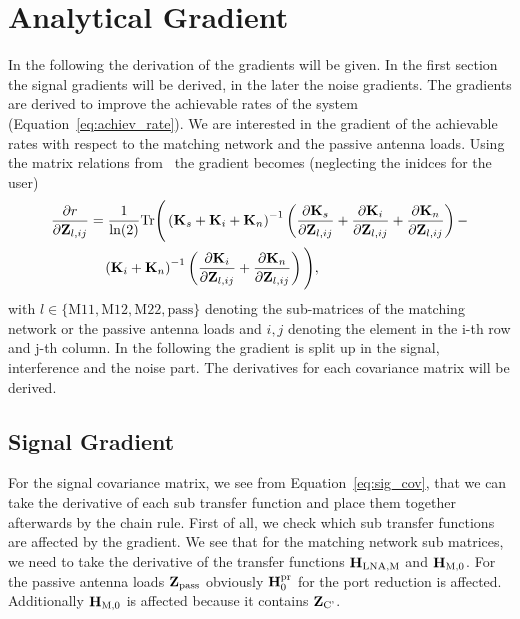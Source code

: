\chapter{Analytical Gradient}
\label{sec:ana_grad}
In the following the derivation of the gradients will be given.
In the first section the signal gradients will be derived, in the later the noise gradients.
The gradients are derived to improve the achievable rates of the system (Equation~\eqref{eq:achiev_rate}).
We are interested in the gradient of the achievable rates with respect to the matching network and the passive antenna loads.
Using the matrix relations from~\cite{Codebook12} the gradient becomes (neglecting the inidces for the user)
\begin{align}
\label{eq:gradient}\nonumber
\frac{\partial r}{\partial\mathbf{Z}_{l,ij}} &= \frac{1}{\text{ln}(2)} 
\text{Tr}\Bigg(\left(\mathbf{K}_s + \mathbf{K}_i + \mathbf{K}_n\right)^{-1}
\left(\frac{\partial\mathbf{K}_s}{\partial\mathbf{Z}_{l,ij}}+
 \frac{\partial\mathbf{K}_i}{\partial\mathbf{Z}_{l,ij}}+
 \frac{\partial\mathbf{K}_n}{\partial\mathbf{Z}_{l,ij}}\right)-\\
 &\quad\left(\mathbf{K}_i+\mathbf{K}_n\right)^{-1}
 \left(\frac{\partial\mathbf{K}_i}{\partial\mathbf{Z}_{l,ij}}+
 	\frac{\partial\mathbf{K}_n}{\partial\mathbf{Z}_{l,ij}}\right)\Bigg),
\end{align}
with $l\in\{\text{M}11,\text{M}12,\text{M}22,\text{pass}\}$ denoting the sub-matrices of the matching network or the passive antenna loads and $i,j$ denoting the element in the i-th row and j-th column.
In the following the gradient is split up in the signal, interference and the noise part.
The derivatives for each covariance matrix will be derived.

\section{Signal Gradient}
\label{sec:signal_gradient}
 For the signal covariance matrix, we see from Equation~\eqref{eq:sig_cov}, that we can take the derivative of each sub transfer function and place them together afterwards by the chain rule.
First of all, we check which sub transfer functions are affected by the gradient.
We see that for the matching network sub matrices, we need to take the derivative of the transfer functions $\mathbf{H}_\text{LNA,M}$ and $\mathbf{H}_\text{M,0}$.
For the passive antenna loads $\mathbf{Z}_\text{pass}$ obviously $\mathbf{H}_0^{\text{pr}}$ for the port reduction is affected.
Additionally $\mathbf{H}_\text{M,0}$ is affected because it contains $\mathbf{Z}_\text{C'}$.

